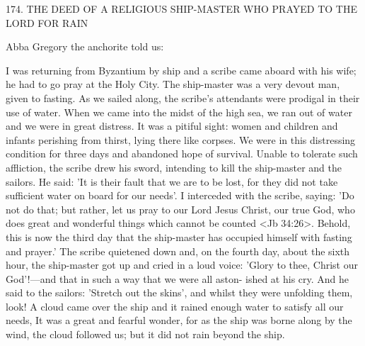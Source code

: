 174.
THE DEED OF A RELIGIOUS SHIP-MASTER
WHO PRAYED TO THE LORD FOR RAIN

Abba Gregory the anchorite told us:

I was returning from Byzantium by ship and a scribe came aboard
with his wife; he had to go pray at the Holy City.
The ship-master
was a very devout man, given to fasting.
As we sailed along, the
scribe's attendants were prodigal in their use of water.
When we
came into the midst of the high sea, we ran out of water and we
were in great distress.
It was a pitiful sight: women and children and
infants perishing from thirst, lying there like corpses.
We were in
this distressing condition for three days and abandoned hope of
survival.
Unable to tolerate such affliction, the scribe drew his
sword, intending to kill the ship-master and the sailors.
He said: 'It
is their fault that we are to be lost, for they did not take sufficient
water on board for our needs'.
I interceded with the scribe, saying:
'Do not do that; but rather, let us pray to our Lord Jesus Christ,
our true God, who does great and wonderful things which cannot
be counted <Jb 34:26>.
Behold, this is now the third day that the
ship-master has occupied himself with fasting and prayer.' The
scribe quietened down and, on the fourth day, about the sixth hour,
the ship-master got up and cried in a loud voice: 'Glory to thee,
Christ our God'!—and that in such a way that we were all aston-
ished at his cry.
And he said to the sailors: 'Stretch out the skins',
and whilst they were unfolding them, look! A cloud came over the
ship and it rained enough water to satisfy all our needs, It was a
great and fearful wonder, for as the ship was borne along by the
wind, the cloud followed us; but it did not rain beyond the ship.

